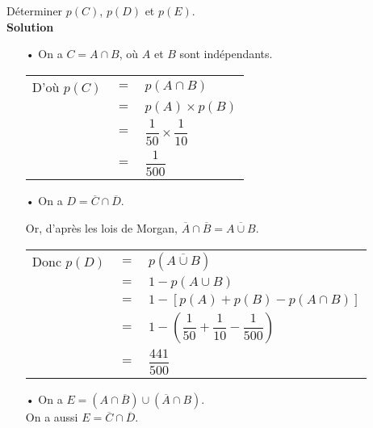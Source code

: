 \vspace*{.3cm}

Déterminer $p\left(C\right)$, $p\left(D\right)$ et $p\left(E\right)$. \\

\textbf{Solution}

\begin{itemize}
\item[•] On a $C = A \cap B$, où $A$ et $B$ sont indépendants. \\

\begin{tabular}{lll}
\hspace*{-.3cm} D'où $p\left(C\right)$ & $=$ & $p\left(A \cap B\right)$ \\
& $=$ & $p\left(A\right) \times p\left(B\right)$ \\
& $=$ & $\dfrac{1}{50} \times \dfrac{1}{10}$ \vspace*{.2cm} \\
& $=$ & $\dfrac{1}{500}$ \\
\end{tabular}

\vspace*{.3cm}

\item[•] On a $D = \overline{C} \cap \overline{D}$. 

Or, d'après les lois de Morgan, $\overline{A} \cap \overline{B} = \overline{A \cup B}$. \\

\begin{tabular}{lll}
\hspace*{-.3cm} Donc $p\left(D\right)$ & $=$ & $p\left(\overline{A \cup B}\right)$ \\
& $=$ & $1 - p\left(A \cup B\right)$ \\
& $=$ & $1 - \left[p\left(A\right) + p\left(B\right) - p\left(A \cap B\right) \right]$ \\
& $=$ & $1 - \left(\dfrac{1}{50} + \dfrac{1}{10} - \dfrac{1}{500}\right)$ \\
& $=$ & $\dfrac{441}{500}$ \\
\end{tabular}

\vspace*{.3cm}

\item[•] On a $E = \left(A \cap \overline{B}\right) \cup \left(\overline{A} \cap B\right)$. \\
On a aussi $E = \overline{C} \cap \overline{D}$. 


\end{itemize}
